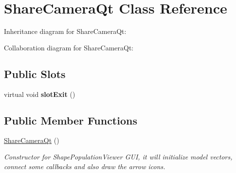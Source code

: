 \hypertarget{class_share_camera_qt}{\section{Share\-Camera\-Qt Class Reference}
\label{class_share_camera_qt}
}


Inheritance diagram for Share\-Camera\-Qt\-:


Collaboration diagram for Share\-Camera\-Qt\-:
\subsection*{Public Slots}
\begin{DoxyCompactItemize}
\item 
\hypertarget{class_share_camera_qt_af0c95f60f094b0ecc4c13590c6cf434e}{virtual void {\bfseries slot\-Exit} ()}\label{class_share_camera_qt_af0c95f60f094b0ecc4c13590c6cf434e}

\end{DoxyCompactItemize}
\subsection*{Public Member Functions}
\begin{DoxyCompactItemize}
\item 
\hyperlink{class_share_camera_qt_a31461db76e84dafb17baa2f832b4353f}{Share\-Camera\-Qt} ()
\begin{DoxyCompactList}\small\item\em Constructor for Shape\-Population\-Viewer G\-U\-I, it will initialize model vectors, connect some callbacks and also draw the arrow icons. \end{DoxyCompactList}\end{DoxyCompactItemize}
